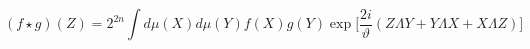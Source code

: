 \begin{equation}\label{eq35:ps}
	(f\star g)(Z)=2^{2n}\int d\mu(X) d\mu(Y) f(X)g(Y) \exp\Big[\frac{2i}{\vartheta}(Z\Lambda Y+Y\Lambda X+ X\Lambda Z)\Big]
\end{equation}

